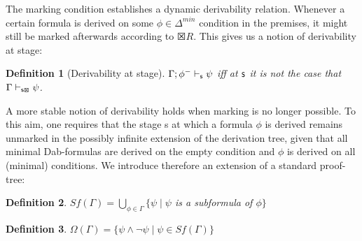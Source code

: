 \documentclass[]{article}
\newtheorem{definition}{Definition}
\newcommand{\Turn}[2]
	{ {#1}\vdash_{\textbf{\sf s}}  {#2}}
\newcommand{\TurnPrime}[2]
	{ {#1}\vdash_{\textbf{\sf s'}}  {#2}}
\newcommand{\TurnMarked}[2]
	{ {#1}\vdash_{\textbf{\sf s\XBox}}  {#2}}
\begin{document}
The marking condition establishes a dynamic derivability relation. Whenever a certain formula is derived on some $\phi\in \Delta^{min}$ condition in the premises, it might still be marked afterwards according to $\XBox R$.
This gives us a notion of derivability at stage: 

\begin{definition}[Derivability at stage]
$\Turn{\Gamma; \phi^{-}}{\psi}$ iff at ${\sf s}$ it is not the case that $\TurnMarked{\Gamma}{\psi}$.
\end{definition}

A more stable notion of derivability holds when marking is no longer possible.
%
%
To this aim, one requires that the stage {\sf s} at which a formula $\phi$ is derived remains unmarked in the possibly infinite extension of the derivation tree, given that all minimal Dab-formulas are derived on the empty condition and $\phi$ is derived on all (minimal) conditions. We introduce therefore an extension of a standard proof-tree:




\begin{definition}
$Sf(\Gamma)=\bigcup_{\phi \in \Gamma} \{\psi \mid \psi$ is a subformula of $ \phi\}$
\end{definition}


\begin{definition}
$\Omega(\Gamma)=\{\psi\wedge \neg \psi \mid \psi\in Sf(\Gamma)\}$
\end{definition}

%
%
\end{document}
